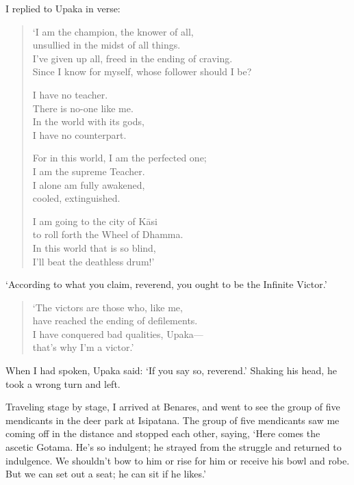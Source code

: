 \documentclass[12pt,openany]{book}%
\begin{document}
I replied to Upaka in verse: 

\begin{verse}%
‘I am the champion, the knower of all, \\
unsullied in the midst of all things. \\
I’ve given up all, freed in the ending of craving. \\
Since I know for myself, whose follower should I be? 

I have no teacher. \\
There is no-one like me. \\
In the world with its gods, \\
I have no counterpart. 

For in this world, I am the perfected one; \\
I am the supreme Teacher. \\
I alone am fully awakened, \\
cooled, extinguished. 

I am going to the city of \textsanskrit{Kāsi} \\
to roll forth the Wheel of Dhamma. \\
In this world that is so blind, \\
I’ll beat the deathless drum!’ 

%
\end{verse}

‘According to what you claim, reverend, you ought to be the Infinite Victor.’ 

\begin{verse}%
‘The victors are those who, like me, \\
have reached the ending of defilements. \\
I have conquered bad qualities, Upaka—\\
that’s why I’m a victor.’ 

%
\end{verse}

When I had spoken, Upaka said: ‘If you say so, reverend.’ Shaking his head, he took a wrong turn and left. 

Traveling stage by stage, I arrived at Benares, and went to see the group of five mendicants in the deer park at Isipatana. The group of five mendicants saw me coming off in the distance and stopped each other, saying, ‘Here comes the ascetic Gotama. He’s so indulgent; he strayed from the struggle and returned to indulgence. We shouldn’t bow to him or rise for him or receive his bowl and robe. But we can set out a seat; he can sit if he likes.’ 
\end{document}
